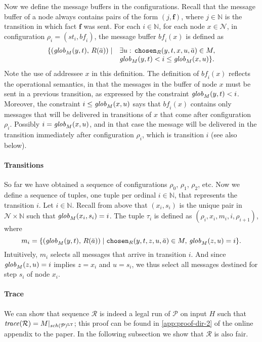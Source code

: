 \documentclass{tlp}
\newcommand{\Nat}{\mathbb{N}}  \newcommand{\len}[1]{|#1|} \newcommand{\rom}[1]{\text{\emph{(#1)}}} \newcommand{\romI}{\rom i}
\newcommand{\ded}{\mathcal{P}}
\newcommand{\fc}{\boldsymbol{f}}
\newcommand{\proj}[2]{#1|_{#2}}
\newcommand{\schof}[1]{\fname{sch}(#1)}
\newcommand{\nw}{\mathcal{N}}
\newcommand{\toloct}[1]{#1^{\mathrm{LT}}}
\newcommand{\chosen}{\pred{chosen}}
\newcommand{\cnf}{\rho}
\newcommand{\cnfs}{\mathit{st}}
\newcommand{\cnfb}{\mathit{bf}}
\newcommand{\pair}[2]{(#1,#2)}
\newcommand{\run}{\mathcal{R}}
\newcommand{\trace}[1]{\fname{trace}(#1)}
\newcommand{\nwnat}{\nw\times\Nat}
\newcommand{\globM}[1]{\fname{glob}_{M}(#1)}
\newcommand{\tup}{\tau}
\begin{document}
Now we define the message buffers in the configurations. Recall that
the message buffer of a node always contains pairs of the form $\pair j{\fc}$,
where $j\in\Nat$ is the transition in which fact $\fc$ was sent.
For each $i\in\Nat$, for each node $x\in\nw$, in configuration $\cnf_{i}=(\cnfs_{i},\cnfb_{i})$,
the message buffer $\cnfb_{i}(x)$ is defined as
\[
\begin{array}{ll}
\{\pair{\globM{y,t}}{\, R(\bar{a})}\mid
    & \exists u:\,\chosen_{R}(y,t,x,u,\bar{a})\in M,\\&\globM{y,t}<i\leq\globM{x,u}\}.
\end{array}
\]
Note the use of addressee $x$ in this definition. The definition
of $\cnfb_{i}(x)$ reflects the operational semantics, in that the
messages in the buffer of node $x$ must be sent in a previous transition,
as expressed by the constraint $\globM{y,t}<i$. Moreover, the constraint
$i\leq\globM{x,u}$ says that $\cnfb_{i}(x)$ contains only messages
that will be delivered in transitions of $x$ that come after configuration
$\cnf_{i}$. Possibly $i=\globM{x,u}$, and in that case the message
will be delivered in the transition immediately after configuration
$\cnf_{i}$, which is transition $i$ (see also below).


\paragraph*{Transitions}

So far we have obtained a sequence of configurations $\cnf_{0}$,
$\cnf_{1}$, $\cnf_{2}$, etc. Now we define a sequence of tuples,
one tuple per ordinal $i\in\Nat$, that represents the transition
$i$. Let $i\in\Nat$. Recall from above that $(x_{i},s_{i})$ is
the unique pair in $\nwnat$ such that $\globM{x_{i},s_{i}}=i$. The
tuple $\tup_{i}$ is defined as $(\cnf_{i},x_{i},m_{i},i,\cnf_{i+1})$,
where 
\[
m_{i}=\{\pair{\globM{y,t}}{\, R(\bar{a})}\mid\chosen_{R}(y,t,z,u,\bar{a})\in M,\,\globM{z,u}=i\}.
\]
Intuitively, $m_{i}$ selects all messages that arrive in transition
$i$. And since $\globM{z,u}=i$ implies $z=x_{i}$ and $u=s_{i}$,
we thus select all messages destined for step $s_{i}$ of node $x_{i}$. 


\paragraph*{Trace}

We can show that sequence $\run$ is indeed
a legal run of $\ded$ on input $H$ such that $\trace{\run}=\proj M{\toloct{\schof{\ded}}}$; this proof can be found in \ref{app:proof-dir-2} of the online appendix to the paper.
In the following subsection we show that $\run$ is also fair.
\end{document}

